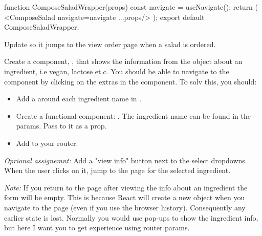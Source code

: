 \documentclass[fleqn, article, a4paper]{memoir}
\begin{document}
\begin{Assignments}
\begin{Code}
function ComposeSaladWrapper(props){
  const navigate = useNavigate();
  return (
    <ComposeSalad navigate={navigate} {...props}/>
  );
}
export default ComposeSaladWrapper;
\end{Code}
\noindent Update  so it jumps to the view order page when a salad is ordered.


\item Create a component, , that shows the information from the  object about an ingredient, i.e vegan, lactose et.c. You should be able to navigate to the  component by clicking on the extras in the  component. To solv this, you should:

\begin{itemize}
  \item Add a  around each ingredient name in .
  \item Create a functional component: . The ingredient name can be found in the params. Pass  to it as a prop.
  \item Add  to your router.
\end{itemize}

\noindent \emph{Oprional assignemnt:} Add a "view info" button next to the select dropdowns. When the user clicks on it, jump to the  page for the selected ingredient.

\emph{Note:} If you return to the  page after viewing the info about an ingredient the form will be empty. This is because React will create a new  object when you navigate to the page (even if you use the browser history). Consequently any earlier state is lost. Normally you would use pop-ups to show the ingredient info, but here I want you to get experience using router params.


\end{Assignments}
\end{document}
